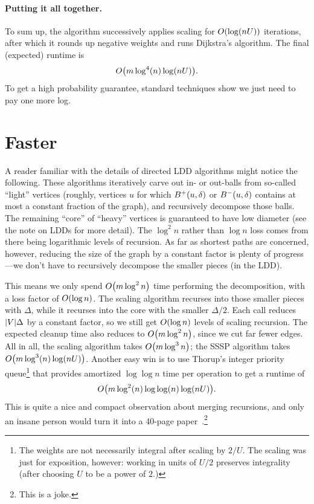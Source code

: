 \documentclass[12pt]{article}
\begin{document}
\paragraph{Putting it all together.}

To sum up, the algorithm successively applies scaling for $\bigO{\log(nU)}$
iterations, after which it rounds up negative weights and runs Dijkstra's
algorithm. The final (expected) runtime is
\[
  \bigO{m\log^4(n)\log(nU)}.
\]
To get a high probability guarantee, standard techniques show we just need to
pay one more log.

\section{Faster}

A reader familiar with the details of directed LDD algorithms might notice the
following. These algorithms iteratively carve out in- or out-balls from
so-called ``light'' vertices (roughly, vertices $u$ for which
$\outball{u, \delta}$ or $\inball{u, \delta}$ contains at most a constant
fraction of the graph), and recursively decompose those balls. The remaining
``core'' of ``heavy'' vertices is guaranteed to have low diameter (see the note
on LDDs for more detail). The $\log^2 n$ rather than $\log n$ loss comes from
there being logarithmic levels of recursion. As far as shortest paths are
concerned, however, reducing the size of the graph by a constant factor is
plenty of progress---we don't have to recursively decompose the smaller pieces
(in the LDD).

This means we only spend $\bigO{m\log^2 n}$ time performing the decomposition,
with a loss factor of $\bigO{\log n}$. The scaling algorithm recurses into those
smaller pieces with $\Delta$, while it recurses into the core with the smaller
$\Delta/2$. Each call reduces $\sizeof{V}\Delta$ by a constant factor, so we
still get $\bigO{\log n}$ levels of scaling recursion. The expected cleanup time
also reduces to $\bigO{m \log^2 n}$, since we cut far fewer edges. All in all,
the scaling algorithm takes $\bigO{m\log^3 n}$; the SSSP algorithm takes
$\bigO{m\log^3(n)\log(nU)}$. Another easy win is to use Thorup's integer
priority queue\footnote{The weights are not necessarily integral after scaling
by $2/U$. The scaling was just for exposition, however: working in units of
$U/2$ preserves integrality (after choosing $U$ to be a power of $2$.)} that
provides amortized $\log\log n$ time per operation to get a runtime of
\[
  \bigO{m \log^2(n)\log\log(n)\log (nU)}.
\]
This is quite a nice and compact observation about merging recursions, and only
an insane person would turn it into a 40-page paper~\cite{BCF23}.\footnote{This
is a joke.}
\end{document}
